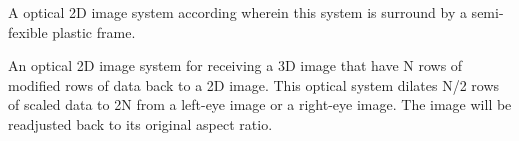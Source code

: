 \documentclass[english]{uspatent}
\begin{document}
  
A optical 2D image system according  wherein this system is surround by a 
semi-fexible plastic frame. 

\patentClaimsEnd

An optical 2D image system for receiving a 3D image that have N rows of modified rows of data back to a 2D image. This optical system dilates N/2 rows of scaled data to 2N from a left-eye image or a right-eye image. The image will be readjusted back to its original aspect ratio.

\end{document}

